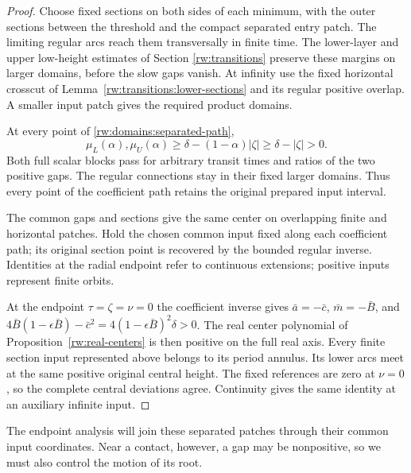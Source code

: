 \begin{proof}
Choose fixed sections on both sides of each minimum, with the outer
sections between the threshold and the compact separated entry patch.
The limiting regular arcs reach them transversally in finite time.
The lower-layer and upper low-height estimates of Section
\ref{rw:transitions} preserve these margins on larger domains, before
the slow gaps vanish. At infinity use the fixed horizontal crosscut
of Lemma~\ref{rw:transitions:lower-sections} and its regular positive
overlap. A smaller input patch gives the required product domains.

At every point of \eqref{rw:domains:separated-path},
\[
 \mu_L(\alpha),\mu_U(\alpha)
 \ge\delta-(1-\alpha)|\zeta|
 \ge\delta-|\zeta|>0.
\]
Both full scalar blocks pass for arbitrary transit times and ratios
of the two positive gaps. The regular connections stay in their fixed
larger domains. Thus every point of the coefficient path retains the
original prepared input interval.

The common gaps and sections give the same center on overlapping
finite and horizontal patches. Hold the chosen common input fixed
along each coefficient path; its original section point is recovered
by the bounded regular inverse. Identities at the radial endpoint
refer to continuous extensions; positive inputs represent finite orbits.

At the endpoint $\tau=\zeta=\nu=0$ the coefficient inverse gives
$\bar a=-\bar c$, $\bar m=-\bar B$, and
$4\bar B(1-\epsilon\bar B)-\bar c^2=4(1-\epsilon\bar B)^2\delta>0$.
The real center polynomial of Proposition~\ref{rw:real-centers} is
then positive on the full real axis. Every finite section input
represented above belongs to its period annulus. Its lower arcs meet
at the same positive original central height. The fixed references
are zero at $\nu=0$, so the complete central deviations agree.
Continuity gives the same identity at an auxiliary infinite input.
\end{proof}

The endpoint analysis will join these separated patches through their
common input coordinates. Near a contact, however, a gap may be
nonpositive, so we must also control the motion of its root.

